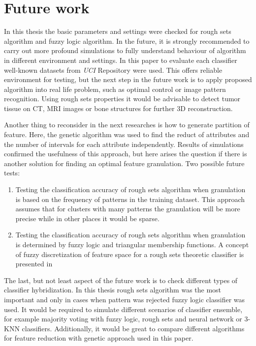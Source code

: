 \section{Future work}
\label{cha:FutureWork}
In this thesis the basic parameters and settings were checked for rough sets
algorithm and fuzzy logic algorithm. In the future, it is strongly recommended 
to carry out more profound simulations to fully understand behaviour of
algorithm in different environment and settings. In this paper to evaluate each
classifier well-known datasets from \textit{UCI} Repository were used. This offers
reliable environment for testing, but the next step in the future work is to
apply proposed algorithm into real life problem, such as optimal control or
image pattern recognition. Using rough sets properties it would be advisable to
detect tumor tissue on CT, MRI images or bone structures for further 3D
reconstruction.

Another thing to reconsider in the next researches is how to generate partition
of feature. Here, the genetic algorithm was used to find the reduct of attributes
and the number of intervals for each attribute independently. Results of
simulations confirmed the usefulness of this approach, but here arises the
question if there is another solution for finding an optimal feature
granulation. Two possible future tests:
\begin{enumerate}
    \item Testing the classification accuracy of rough sets algorithm when
        granulation is based on the frequency of patterns in the training
        dataset. This approach assumes that for clusters with many patterns the
        granulation will be more precise while in other places it would be
        sparse.
    \item Testing the classification accuracy of rough  sets algorithm when
        granulation is determined by fuzzy logic and triangular membership
        functions. A concept of fuzzy discretization of feature space for a
        rough sets theoretic classifier is presented in \cite{bib1}
\end{enumerate}

The last, but not least aspect of the future work is to check different types
of classifier hybridization. In this thesis rough sets algorithm was the most
important and only in cases when pattern was rejected fuzzy logic classifier
was used. It would be required to simulate different scenarios of classifier
ensemble, for example majority voting with fuzzy logic, rough sets and neural
network or 3-KNN classifiers. Additionally, it would be great to compare
different algorithms for feature reduction with genetic approach used in this
paper. 
